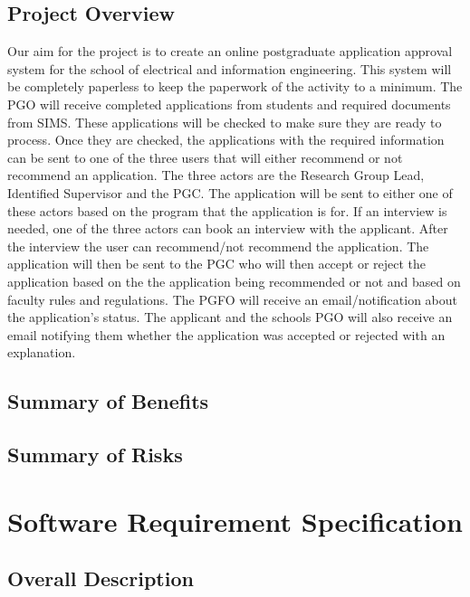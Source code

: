 \documentclass{article}
\begin{document}
\subsection{Project Overview}
Our aim for the project is to create an online postgraduate application approval system for the school of electrical and information engineering. This system will be completely paperless to keep the paperwork of the activity to a minimum.
The PGO will receive completed applications from students and required documents from SIMS.
These applications will be checked to make sure they are ready to process. Once they are checked,
the applications with the required information can be sent to one of the three users that will either
recommend or not recommend an application. The three actors are the Research Group Lead, Identified Supervisor and the PGC. The application will be sent to either one of these actors based on the program
that the application is for. If an interview is needed, one of the three actors can book an interview
with the applicant. After the interview the user can recommend/not recommend the application. The
application will then be sent to the PGC who will then accept or reject the application based on the
the application being recommended or not and based on faculty rules and regulations. The PGFO
will receive an email/notification about the application's status. The applicant and the schools PGO
will also receive an email notifying them whether the application was accepted or rejected with an explanation.
\subsection{Summary of Benefits}
\subsection{Summary of Risks}

\section{Software Requirement Specification}
\subsection{Overall Description}
\end{document}
